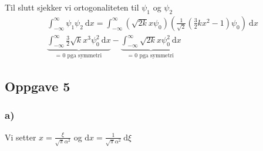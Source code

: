 \documentclass{article}
\begin{document}
Til slutt sjekker vi ortogonaliteten til $ψ_1$ og $ψ_2$
\begin{align*}
∫_{-∞}^{∞} ψ_1ψ_2 \ \mathrm{d}x = ∫_{-∞}^{∞} \left(\sqrt{2k}xψ_0\right) \left(\frac{1}{\sqrt{2}} \left(\frac{3}{2}kx^2 - 1\right)ψ_0\right) \ \mathrm{d}x
\\
\underbrace{∫_{-∞}^{∞} \frac{3}{2}  \sqrt{k}x^3ψ_0^2 \ \mathrm{d}x}_{\text{= 0 pga symmetri}} - \underbrace{∫_{-∞}^{∞} \sqrt{2k}xψ_0^2 \ \mathrm{d}x}_{\text{= 0 pga symmetri}}
\end{align*}
\subsection*{Oppgave 5}
\subsubsection*{a)}
Vi setter $x = \frac{ξ}{\sqrt{π}α^2}$ og $\mathrm{d}x = \frac{1}{\sqrt{π}α^2} \ \mathrm{d}ξ$
\end{document}
